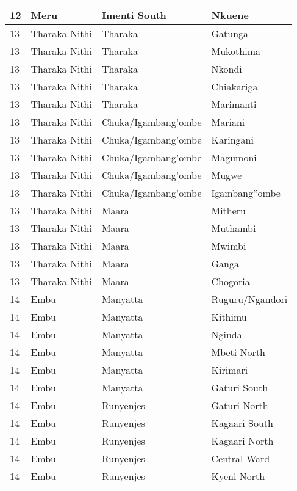\begin{table}[!ht]
\begin{tabular}{|l|l|l|l|}
        12 & Meru & Imenti South & Nkuene \\ \hline
        13 & Tharaka Nithi & Tharaka  & Gatunga \\ \hline
        13 & Tharaka Nithi & Tharaka  & Mukothima \\ \hline
        13 & Tharaka Nithi & Tharaka  & Nkondi \\ \hline
        13 & Tharaka Nithi & Tharaka  & Chiakariga \\ \hline
        13 & Tharaka Nithi & Tharaka  & Marimanti \\ \hline
        13 & Tharaka Nithi & Chuka/Igambang’ombe & Mariani \\ \hline
        13 & Tharaka Nithi & Chuka/Igambang’ombe & Karingani \\ \hline
        13 & Tharaka Nithi & Chuka/Igambang’ombe & Magumoni \\ \hline
        13 & Tharaka Nithi & Chuka/Igambang’ombe & Mugwe \\ \hline
        13 & Tharaka Nithi & Chuka/Igambang’ombe & Igambang''ombe \\ \hline
        13 & Tharaka Nithi & Maara & Mitheru \\ \hline
        13 & Tharaka Nithi & Maara & Muthambi \\ \hline
        13 & Tharaka Nithi & Maara & Mwimbi \\ \hline
        13 & Tharaka Nithi & Maara & Ganga \\ \hline
        13 & Tharaka Nithi & Maara & Chogoria \\ \hline
        14 & Embu & Manyatta & Ruguru/Ngandori \\ \hline
        14 & Embu & Manyatta & Kithimu \\ \hline
        14 & Embu & Manyatta & Nginda \\ \hline
        14 & Embu & Manyatta & Mbeti North \\ \hline
        14 & Embu & Manyatta & Kirimari \\ \hline
        14 & Embu & Manyatta & Gaturi South \\ \hline
        14 & Embu & Runyenjes & Gaturi North \\ \hline
        14 & Embu & Runyenjes & Kagaari South \\ \hline
        14 & Embu & Runyenjes & Kagaari North \\ \hline
        14 & Embu & Runyenjes & Central Ward \\ \hline
        14 & Embu & Runyenjes & Kyeni North \\ \hline

\end{tabular}
\end{table}
